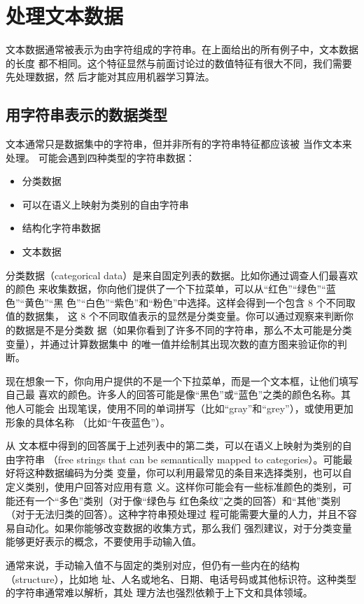 \chapter{处理文本数据}
文本数据通常被表示为由字符组成的字符串。在上面给出的所有例子中，文本数据的长度
都不相同。这个特征显然与前面讨论过的数值特征有很大不同，我们需要先处理数据，然
后才能对其应用机器学习算法。
\section{用字符串表示的数据类型}
文本通常只是数据集中的字符串，但并非所有的字符串特征都应该被
当作文本来处理。
可能会遇到四种类型的字符串数据：
\begin{itemize}
    \item 分类数据
    \item 可以在语义上映射为类别的自由字符串
    \item 结构化字符串数据
    \item 文本数据
\end{itemize}

分类数据（categorical data）是来自固定列表的数据。比如你通过调查人们最喜欢的颜色
来收集数据，你向他们提供了一个下拉菜单，可以从“红色”“绿色”“蓝色”“黄色”“黑
色”“白色”“紫色”和“粉色”中选择。这样会得到一个包含 8 个不同取值的数据集，
这 8 个不同取值表示的显然是分类变量。你可以通过观察来判断你的数据是不是分类数
据（如果你看到了许多不同的字符串，那么不太可能是分类变量），并通过计算数据集中
的唯一值并绘制其出现次数的直方图来验证你的判断。

现在想象一下，你向用户提供的不是一个下拉菜单，而是一个文本框，让他们填写自己最
喜欢的颜色。许多人的回答可能是像“黑色”或“蓝色”之类的颜色名称。其他人可能会
出现笔误，使用不同的单词拼写（比如“gray”和“grey”），或使用更加形象的具体名称
（比如“午夜蓝色”）。

从
文本框中得到的回答属于上述列表中的第二类，可以在语义上映射为类别的自由字符串
（free strings that can be semantically mapped to categories）。可能最好将这种数据编码为分类
变量，你可以利用最常见的条目来选择类别，也可以自定义类别，使用户回答对应用有意
义。这样你可能会有一些标准颜色的类别，可能还有一个“多色”类别（对于像“绿色与
红色条纹”之类的回答）和“其他”类别（对于无法归类的回答）。这种字符串预处理过
程可能需要大量的人力，并且不容易自动化。如果你能够改变数据的收集方式，那么我们
强烈建议，对于分类变量能够更好表示的概念，不要使用手动输入值。

通常来说，手动输入值不与固定的类别对应，但仍有一些内在的结构（structure），比如地
址、人名或地名、日期、电话号码或其他标识符。这种类型的字符串通常难以解析，其处
理方法也强烈依赖于上下文和具体领域。

